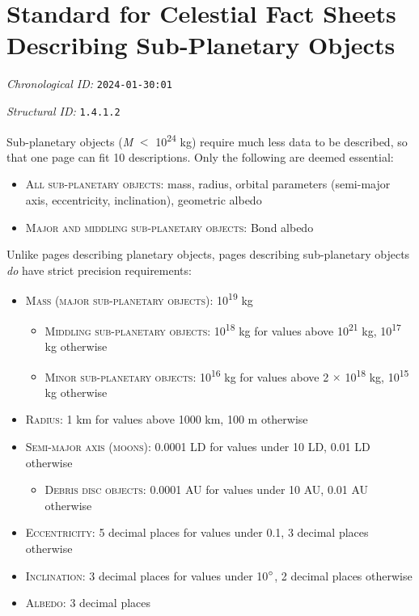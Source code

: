 \section{Standard for Celestial Fact Sheets Describing Sub-Planetary Objects}
\emph{Chronological ID:} \texttt{2024-01-30:01}

\emph{Structural ID:} \texttt{1.4.1.2}

Sub-planetary objects (\emph{M} $<$ 10\textsuperscript{24} kg) require much less data to be described, so that one page can fit 10 descriptions. Only the following are deemed essential:

\begin{itemize}
  \item \textsc{All sub-planetary objects:} mass, radius, orbital parameters (semi-major axis, eccentricity, inclination), geometric albedo
  \item \textsc{Major and middling sub-planetary objects:} Bond albedo
\end{itemize}

Unlike pages describing planetary objects, pages describing sub-planetary objects \emph{do} have strict precision requirements:

\begin{itemize}
  \item \textsc{Mass (major sub-planetary objects):} 10\textsuperscript{19} kg
  \begin{itemize}
    \item \textsc{Middling sub-planetary objects:} 10\textsuperscript{18} kg for values above 10\textsuperscript{21} kg, 10\textsuperscript{17} kg otherwise
    \item \textsc{Minor sub-planetary objects:} 10\textsuperscript{16} kg for values above 2 $\times$ 10\textsuperscript{18} kg, 10\textsuperscript{15} kg otherwise
  \end{itemize}
  \item \textsc{Radius:} 1 km for values above 1000 km, 100 m otherwise
  \item \textsc{Semi-major axis (moons):} 0.0001 LD for values under 10 LD, 0.01 LD otherwise
  \begin{itemize}
    \item \textsc{Debris disc objects:} 0.0001 AU for values under 10 AU, 0.01 AU otherwise
  \end{itemize}
  \item \textsc{Eccentricity:} 5 decimal places for values under 0.1, 3 decimal places otherwise
  \item \textsc{Inclination:} 3 decimal places for values under 10$\degree$, 2 decimal places otherwise
  \item \textsc{Albedo:} 3 decimal places
\end{itemize}
\newpage
